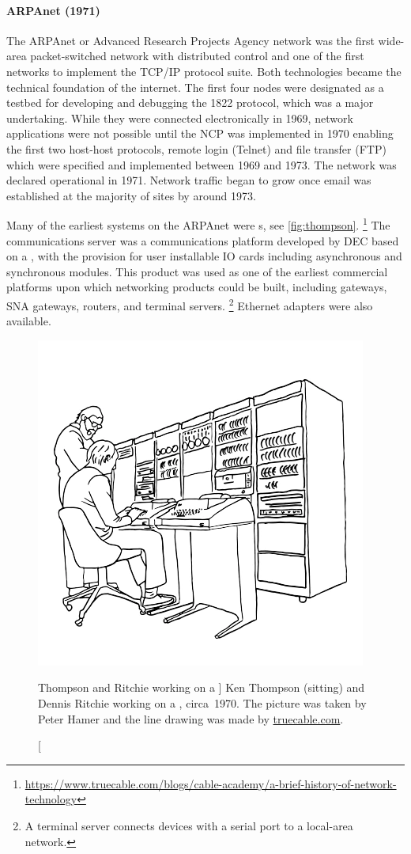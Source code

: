 {\paragraph{ARPAnet (1971)}
The ARPAnet or Advanced Research Projects Agency network was the first wide-area packet-switched network with distributed control and one of the first networks to implement the \acs{TCP}/\acs{IP} protocol suite.
Both technologies became the technical foundation of the internet.
The first four nodes were designated as a testbed for developing and debugging the 1822 protocol, which was a major undertaking.
While they were connected electronically in 1969, network applications were not possible until the \gls{NCP} was implemented in 1970 enabling the first two host-host protocols, remote login (Telnet) and file transfer (\acs{FTP}) which were specified and implemented between 1969 and 1973.
The network was declared operational in 1971.
Network traffic began to grow once email was established at the majority of sites by around 1973.

Many of the earliest systems on the ARPAnet were s, see \vref{fig:thompson}.%
\footnote{\href{https://www.truecable.com/blogs/cable-academy/a-brief-history-of-network-technology}{https://www.truecable.com/blogs/cable-academy/a-brief-history-of-network-technology}}
The  communications server was a communications platform developed by \gls{DEC} based on a , with the provision for user installable \gls{IO} cards including asynchronous and synchronous modules.
This product was used as one of the earliest commercial platforms upon which networking products could be built, including  gateways, \gls{SNA} gateways, routers, and terminal servers.%
\footnote{A terminal server connects devices with a serial port to a local-area network.}
Ethernet adapters were also available.

\begin{figure}
\centering
\includegraphics[width=.5\textwidth]{images/thompson.png}
\caption%
   [Thompson and Ritchie working on a ]%
   {Ken Thompson (sitting) and Dennis Ritchie working on a , circa~1970. The picture was taken by Peter Hamer and the line drawing was made by \href{https://www.truecable.com/blogs/cable-academy/a-brief-history-of-network-technology}{truecable.com}.}
\label{fig:thompson}
\end{figure}

}
